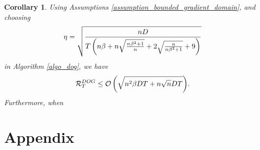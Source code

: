 \documentclass{article}
\newtheorem{Corollary}{\bf{Corollary}}
\begin{document}
\begin{Corollary}
Using Assumptions \ref{assumption_bounded_gradient_domain}, and choosing 
\begin{align}
\nonumber
\eta = \sqrt{\frac{nD}{T\left( n\beta + n\sqrt{\frac{n\beta^2+1}{n}} + 2\sqrt{\frac{n}{n\beta^2+1}} + 9  \right)}}
\end{align} in Algorithm \ref{algo_dog}, we have
\begin{align}
\nonumber
{\mathcal{R}}_T^{DOG} \le {\mathcal{O}\left( \sqrt{ n^2\beta DT + n\sqrt{n}DT} \right)}.
\end{align} Furthermore, when 




\end{Corollary}











\section*{Appendix}
\end{document}
